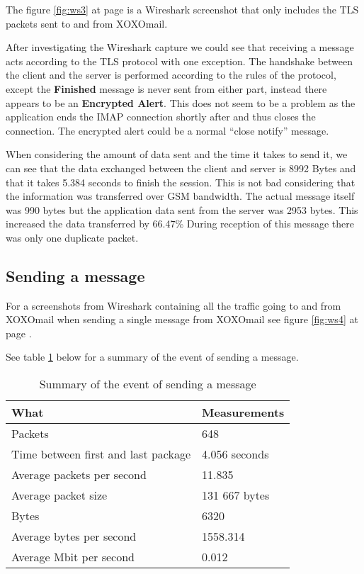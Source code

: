 The figure \ref{fig:ws3} at page \pageref{fig:ws3} is a Wireshark screenshot that only includes the TLS packets sent to and from XOXOmail.
\newline

After investigating the Wireshark capture we could see that receiving a message acts according to the TLS protocol with one exception. The handshake between the client and the server is performed according to the rules of the protocol, except the \textbf{Finished}  message is never sent from either part, instead there appears to be an \textbf{Encrypted Alert}. This does not seem to be a problem as the application ends the IMAP connection shortly after and thus closes the connection. The encrypted alert could be a normal “close notify” message.

\pagebreak

When considering the amount of data sent and the time it takes to send it, we can see that the data exchanged between the client and server is 8992 Bytes and that it takes 5.384 seconds to finish the session. This is not bad considering that the information was transferred over GSM bandwidth. The actual message itself was 990 bytes but the application data sent from the server was 2953 bytes. This increased the data transferred by 66.47\% During reception of this message there was only one duplicate packet.

\subsection{Sending a message}

For a screenshots from Wireshark containing all the traffic going to and from XOXOmail when sending a single message from XOXOmail see figure \ref{fig:ws4} at page \pageref{fig:ws4}.

See table \ref{tab:summarysenmes} below for a summary of the event of sending a message.
\begin{table}[h!]
\begin{center}
\begin{tabular}{l|l} \hline
\textbf{What} & \textbf{Measurements} \\ \hline \hline
Packets & 648 \\
Time between first and last package & 4.056 seconds \\
Average packets per second & 11.835 \\
Average packet size & 131 667 bytes \\
Bytes & 6320 \\
Average bytes per second & 1558.314 \\
Average Mbit per second & 0.012 \\ \hline
\end{tabular}
\end{center}
\caption{Summary of the event of sending a message} \label{tab:summarysenmes}
\end{table}

